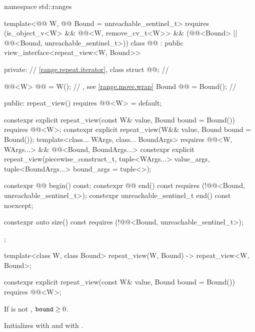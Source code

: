 \begin{codeblock}
namespace std::ranges {
  template<@@ W, @@ Bound = unreachable_sentinel_t>
    requires (is_object_v<W> && @@<W, remove_cv_t<W>> &&
              (@@<Bound> || @@<Bound, unreachable_sentinel_t>))
  class @@ : public view_interface<repeat_view<W, Bound>> {
  private:
    // \ref{range.repeat.iterator}, class 
    struct @@;    // \expos

    @@<W> @@ = W();    // \expos, see \ref{range.move.wrap}
    Bound @@ = Bound();    // \expos

  public:
    repeat_view() requires @@<W> = default;

    constexpr explicit repeat_view(const W& value, Bound bound = Bound())
      requires @@<W>;
    constexpr explicit repeat_view(W&& value, Bound bound = Bound());
    template<class... WArgs, class... BoundArgs>
      requires @@<W, WArgs...> &&
               @@<Bound, BoundArgs...>
    constexpr explicit repeat_view(piecewise_construct_t,
      tuple<WArgs...> value_args, tuple<BoundArgs...> bound_args = tuple<>{});

    constexpr @@ begin() const;
    constexpr @@ end() const requires (!@@<Bound, unreachable_sentinel_t>);
    constexpr unreachable_sentinel_t end() const noexcept;

    constexpr auto size() const requires (!@@<Bound, unreachable_sentinel_t>);
  };

  template<class W, class Bound>
    repeat_view(W, Bound) -> repeat_view<W, Bound>;
}
\end{codeblock}

%
\begin{itemdecl}
constexpr explicit repeat_view(const W& value, Bound bound = Bound())
  requires @@<W>;
\end{itemdecl}

\begin{itemdescr}
\pnum
\expects
If  is not ,
$\texttt{bound} \ge 0$.

\pnum
\effects
Initializes  with  and
 with .
\end{itemdescr}

